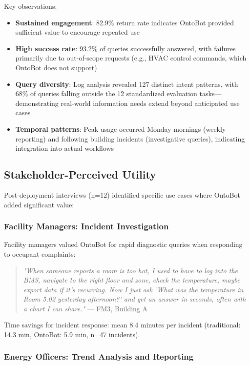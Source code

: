 \documentclass[acmlarge]{acmart}
\begin{document}
Key observations:
\begin{itemize}
    \item \textbf{Sustained engagement}: 82.9\% return rate indicates OntoBot provided sufficient value to encourage repeated use
    \item \textbf{High success rate}: 93.2\% of queries successfully answered, with failures primarily due to out-of-scope requests (e.g., HVAC control commands, which OntoBot does not support)
    \item \textbf{Query diversity}: Log analysis revealed 127 distinct intent patterns, with 68\% of queries falling outside the 12 standardized evaluation tasks—demonstrating real-world information needs extend beyond anticipated use cases
    \item \textbf{Temporal patterns}: Peak usage occurred Monday mornings (weekly reporting) and following building incidents (investigative queries), indicating integration into actual workflows
\end{itemize}

\subsection{Stakeholder-Perceived Utility}

Post-deployment interviews (n=12) identified specific use cases where OntoBot added significant value:

\subsubsection{Facility Managers: Incident Investigation}

Facility managers valued OntoBot for rapid diagnostic queries when responding to occupant complaints:

\begin{quote}
\textit{"When someone reports a room is too hot, I used to have to log into the BMS, navigate to the right floor and zone, check the temperature, maybe export data if it's recurring. Now I just ask 'What was the temperature in Room 5.02 yesterday afternoon?' and get an answer in seconds, often with a chart I can share."} — FM3, Building A
\end{quote}

Time savings for incident response: mean 8.4 minutes per incident (traditional: 14.3 min, OntoBot: 5.9 min, n=47 incidents).

\subsubsection{Energy Officers: Trend Analysis and Reporting}
\end{document}
